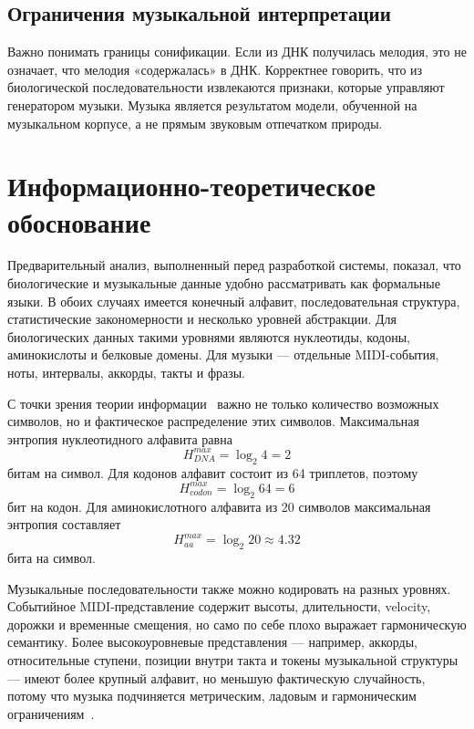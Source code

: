 \subsection{Ограничения музыкальной интерпретации}

Важно понимать границы сонификации. Если из ДНК получилась мелодия, это не означает, что мелодия «содержалась» в ДНК. Корректнее говорить, что из биологической последовательности извлекаются признаки, которые управляют генератором музыки. Музыка является результатом модели, обученной на музыкальном корпусе, а не прямым звуковым отпечатком природы.

\section{Информационно-теоретическое обоснование}

Предварительный анализ, выполненный перед разработкой системы, показал, что биологические и музыкальные данные удобно рассматривать как формальные языки. В обоих случаях имеется конечный алфавит, последовательная структура, статистические закономерности и несколько уровней абстракции. Для биологических данных такими уровнями являются нуклеотиды, кодоны, аминокислоты и белковые домены. Для музыки — отдельные MIDI-события, ноты, интервалы, аккорды, такты и фразы.

С точки зрения теории информации~\cite{shannon1948} важно не только количество возможных символов, но и фактическое распределение этих символов. Максимальная энтропия нуклеотидного алфавита равна
\begin{equation}
H_{DNA}^{max} = \log_2 4 = 2
\end{equation}
битам на символ. Для кодонов алфавит состоит из 64 триплетов, поэтому
\begin{equation}
H_{codon}^{max} = \log_2 64 = 6
\end{equation}
бит на кодон. Для аминокислотного алфавита из 20 символов максимальная энтропия составляет
\begin{equation}
H_{aa}^{max} = \log_2 20 \approx 4.32
\end{equation}
бита на символ.

Музыкальные последовательности также можно кодировать на разных уровнях. Событийное MIDI-представление содержит высоты, длительности, velocity, дорожки и временные смещения, но само по себе плохо выражает гармоническую семантику. Более высокоуровневые представления — например, аккорды, относительные ступени, позиции внутри такта и токены музыкальной структуры — имеют более крупный алфавит, но меньшую фактическую случайность, потому что музыка подчиняется метрическим, ладовым и гармоническим ограничениям~\cite{muller2015}.


